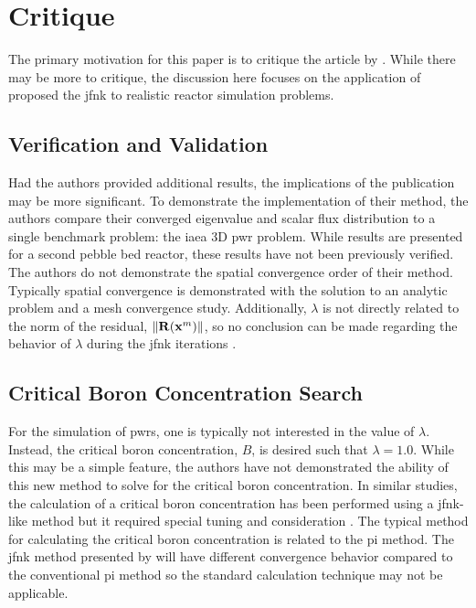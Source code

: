 \section{Critique}
\label{sec:critique}

  The primary motivation for this paper is to critique the article by
  \citeauthor{qe2paper}. While there may be more to critique, the discussion
  here focuses on the application of proposed the \gls{jfnk} to realistic
  reactor simulation problems.

  \subsection{Verification and Validation}

    Had the authors provided additional results, the implications of the
    publication may be more significant. To demonstrate the implementation of
    their method, the authors compare their converged eigenvalue and scalar flux
    distribution to a single benchmark problem: the \gls{iaea} 3D \gls{pwr}
    problem. While results are presented for a second pebble bed reactor, these
    results have not been previously verified. The authors do not demonstrate
    the spatial convergence order of their method. Typically spatial convergence
    is demonstrated with the solution to an analytic problem and a mesh
    convergence study. Additionally, $\lambda$ is not directly related to the
    norm of the residual, $\| \mathbf{R} (\mathbf{x}^m) \|$, so no conclusion can be
    made regarding the behavior of $\lambda$ during the \gls{jfnk} iterations
    \cite{caslJFNK}.

  \subsection{Critical Boron Concentration Search}

    For the simulation of \glspl{pwr}, one is typically not interested in the
    value of $\lambda$. Instead, the critical boron concentration, $B$, is
    desired such that $\lambda=1.0$. While this may be a simple feature, the
    authors have not demonstrated the ability of this new method to solve for
    the critical boron concentration. In similar studies, the calculation of a
    critical boron concentration has been performed using a \gls{jfnk}-like
    method but it required special tuning and consideration \cite{caslJFNK}. The
    typical method for calculating the critical boron concentration is related
    to the \gls{pi} method. The \gls{jfnk} method presented by
    \citeauthor{qe2paper} will have different convergence behavior compared to
    the conventional \gls{pi} method so the standard calculation technique may
    not be applicable.

